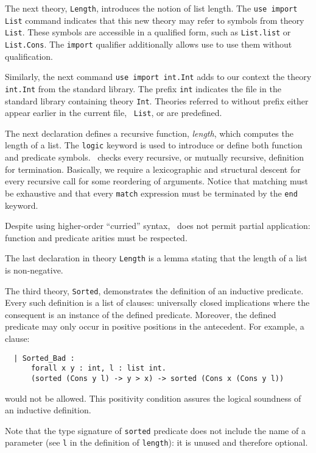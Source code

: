 The next theory, \texttt{Length}, introduces the notion of list
length. The \texttt{use import List} command indicates that this new
theory may refer to symbols from theory \texttt{List}. These symbols
are accessible in a qualified form, such as \texttt{List.list} or
\texttt{List.Cons}. The \texttt{import} qualifier additionally allows
use to use them without qualification.

Similarly, the next command \texttt{use import int.Int} adds to our
context the theory \texttt{int.Int} from the standard library. The
prefix \texttt{int} indicates the file in the standard library
containing theory \texttt{Int}. Theories referred to without prefix
either appear earlier in the current file, \eg\ \texttt{List}, or are
predefined.

The next declaration defines a recursive function, \emph{length},
which computes the length of a list. The \texttt{logic} keyword is
used to introduce or define both function and predicate symbols.
\why\ checks every recursive, or mutually recursive, definition for
termination. Basically, we require a lexicographic and structural
descent for every recursive call for some reordering of arguments.
Notice that matching must be exhaustive and that every \texttt{match}
expression must be terminated by the \texttt{end} keyword.

Despite using higher-order ``curried'' syntax, \why\ does not permit
partial application: function and predicate arities must be respected.

The last declaration in theory \texttt{Length} is a lemma stating that
the length of a list is non-negative.

The third theory, \texttt{Sorted}, demonstrates the definition of
an inductive predicate. Every such definition is a list of clauses:
universally closed implications where the consequent is an instance
of the defined predicate. Moreover, the defined predicate may only
occur in positive positions in the antecedent. For example, a clause:
\begin{verbatim}
  | Sorted_Bad :
      forall x y : int, l : list int.
      (sorted (Cons y l) -> y > x) -> sorted (Cons x (Cons y l))
\end{verbatim}
would not be allowed. This positivity condition assures the logical
soundness of an inductive definition.

Note that the type signature of \texttt{sorted} predicate does not
include the name of a parameter (see \texttt{l} in the definition
of \texttt{length}): it is unused and therefore optional.

